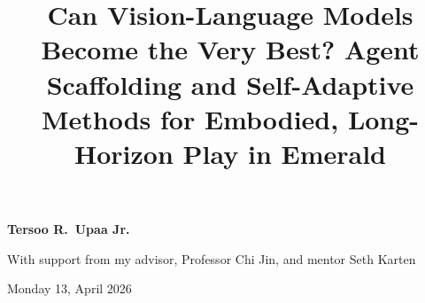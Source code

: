 \documentclass[12pt]{article}
\title{Can Vision-Language Models Become the Very Best? Agent Scaffolding and Self-Adaptive Methods for Embodied, Long-Horizon Play in \pokemon{} Emerald}
\begin{document}
\begin{center}
\maketitle
\textbf{Tersoo R.\ Upaa Jr.} \\
\vspace{1em}

With support from my advisor, Professor Chi Jin, and mentor Seth Karten \\ 
\vspace{1em}

Monday 13, April 2026
\vspace{2em}
\end{center}
















\newpage

\end{document}
